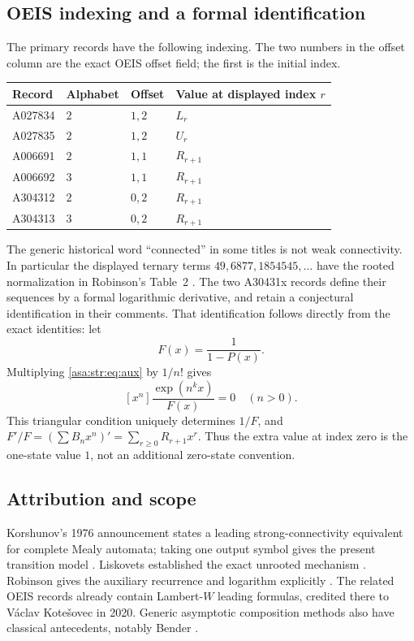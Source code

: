 \documentclass[11pt,letterpaper]{article}
\theoremstyle{remark}\newtheorem{remark}[theorem]{Remark}
\numberwithin{equation}{section}
\begin{document}
\subsection{OEIS indexing and a formal identification}
The primary records \cite{OEIS} have the following indexing. The two numbers in the offset column are the exact OEIS offset field; the first is the initial index.
\begin{center}\small
\begin{tabular}{llll}
\toprule
Record&Alphabet&Offset&Value at displayed index $r$\\
\midrule
A027834&$2$&$1,2$&$L_r$\\
A027835&$2$&$1,2$&$U_r$\\
A006691&$2$&$1,1$&$R_{r+1}$\\
A006692&$3$&$1,1$&$R_{r+1}$\\
A304312&$2$&$0,2$&$R_{r+1}$\\
A304313&$3$&$0,2$&$R_{r+1}$\\
\bottomrule
\end{tabular}
\end{center}
The generic historical word ``connected'' in some titles is not weak connectivity. In particular the displayed ternary terms $49,6877,1854545,\ldots$ have the rooted normalization in Robinson's Table~2 \cite{R85}. The two A30431x records define their sequences by a formal logarithmic derivative, and retain a conjectural identification in their comments. That identification follows directly from the exact identities: let
\[
 F(x)=\frac1{1-P(x)}.
\]
Multiplying \eqref{asa:str:eq:aux} by $1/n!$ gives
\[
 [x^n]\frac{\exp(n^kx)}{F(x)}=0\quad(n>0).
\]
This triangular condition uniquely determines $1/F$, and
$F'/F=(\sum B_nx^n)'=\sum_{r\ge0}R_{r+1}x^r$.
Thus the extra value at index zero is the one-state value $1$, not an additional zero-state convention.

\subsection{Attribution and scope}\label{asa:str:sec:attribution}
Korshunov's 1976 announcement states a leading strong-connectivity equivalent for complete Mealy automata; taking one output symbol gives the present transition model \cite{korshunov1976}. Liskovets established the exact unrooted mechanism \cite{L71,L98}. Robinson gives the auxiliary recurrence and logarithm explicitly \cite{R85}. The related OEIS records already contain Lambert-$W$ leading formulas, credited there to V\'aclav Kote\v{s}ovec in 2020. Generic asymptotic composition methods also have classical antecedents, notably Bender \cite{B75}.
\end{document}

